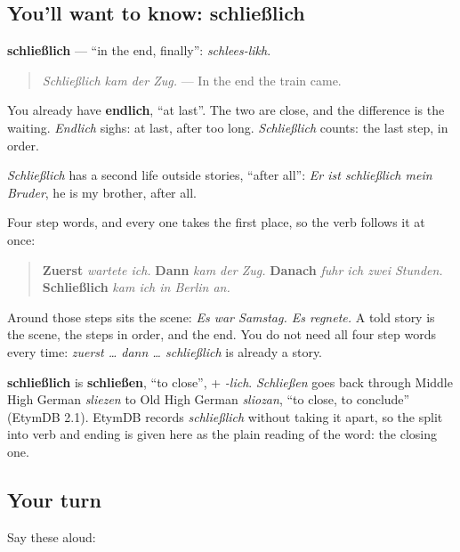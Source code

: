 \subsection*{You'll want to know: schließlich}
\textbf{schließlich} — \textquotedblleft{}in the end, finally\textquotedblright{}: \emph{schlees-likh}.

\begin{quote}
\emph{Schließlich kam der Zug.} — In the end the train came.
\end{quote}

You already have \textbf{endlich}, \textquotedblleft{}at last\textquotedblright{}. The two are close, and the difference is the waiting. \emph{Endlich} sighs: at last, after too long. \emph{Schließlich} counts: the last step, in order.

\emph{Schließlich} has a second life outside stories, \textquotedblleft{}after all\textquotedblright{}: \emph{Er ist schließlich mein Bruder}, he is my brother, after all.

\begin{grammarlens}[title={Grammar Lens: the frame of a told story}]
Four step words, and every one takes the first place, so the verb follows it at once:

\begin{quote}
\textbf{Zuerst} \emph{wartete ich.} \textbf{Dann} \emph{kam der Zug.} \textbf{Danach} \emph{fuhr ich zwei Stunden.} \textbf{Schließlich} \emph{kam ich in Berlin an.}
\end{quote}

Around those steps sits the scene: \emph{Es war Samstag. Es regnete.} A told story is the scene, the steps in order, and the end. You do not need all four step words every time: \emph{zuerst … dann … schließlich} is already a story.
\end{grammarlens}

\begin{cousinweb}
\textbf{schließlich} is \textbf{schließen}, \textquotedblleft{}to close\textquotedblright{}, + \emph{-lich}. \emph{Schließen} goes back through Middle High German \emph{sliezen} to Old High German \emph{sliozan}, \textquotedblleft{}to close, to conclude\textquotedblright{} (EtymDB 2.1). EtymDB records \emph{schließlich} without taking it apart, so the split into verb and ending is given here as the plain reading of the word: the closing one.
\end{cousinweb}

\subsection*{Your turn}
Say these aloud:

